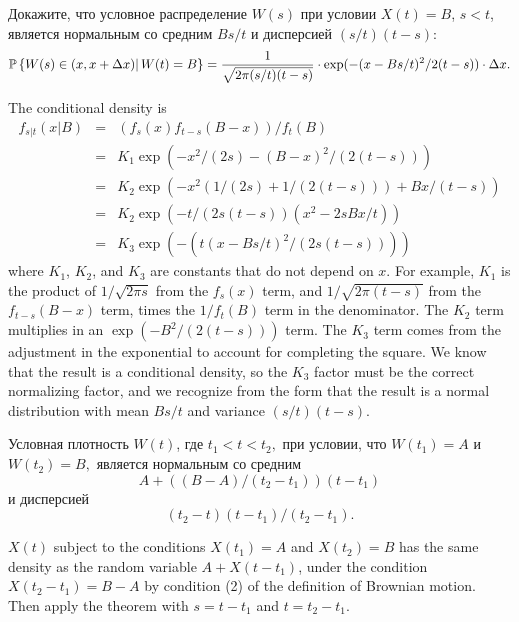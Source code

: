 \begin{problem}
  Докажите, что условное распределение $W(s)$ при условии $X(t)=B$,
  $s < t $, является нормальным со средним $B s/t$ и дисперсией $(s/t)(t-s)$:
  $$
    \mathbb{P}\left\{ W(s) \in (x,x+\Delta x) |\, W(t) = B\right\} =
    \frac{1}{\sqrt{2\pi (s/t)(t-s)}}\cdot \exp(-(x-Bs/t)^2/2(t-s)) \cdot\Delta x.
  $$


\begin{sol}

The conditional density is
\begin{eqnarray*}
  f_{s|t}(x|B) &=& ( f_s(x) f_{t-s}(B-x) )/ f_t(B) \\
  &=& K_1 \exp( -x^2/(2s) - (B-x)^2/( 2(t-s) ) ) \\
  &=& K_2 \exp(-x^2(1/(2 s)+ 1/(2 (t-s) )) + Bx/(t-s) ) \\
  &=& K_2 \exp( -t/( 2 s (t-s) ) ( x^2 - 2 s B x/t) ) \\
  &=& K_3 \exp( - (t (x - B s/t)^2/ (2 s (t-s)) ) )
\end{eqnarray*}
where $ K_1 $, $ K_2 $, and $ K_3 $ are constants that do not depend on $
x $.  For example, $ K_1 $ is the product of $ 1/\sqrt{2 \pi s} $ from
the $ f_s(x) $ term, and $ 1/\sqrt{2 \pi (t-s)} $ from the $ f_{t-s}(B-x)
$ term, times the $ 1/f_t(B) $ term in the denominator.  The $ K_2 $
term multiplies in an $ \exp(-B^2/(2 (t-s))) $ term.  The $ K_3 $ term
comes from the adjustment in the exponential to account for completing
the square.  We know that the result is a conditional density, so the $
K_3 $ factor must be the correct normalizing factor, and we recognize
from the form that the result is a normal distribution with mean $ B s/t
$ and variance $ (s/t) (t-s) $.
\end{sol}
\end{problem}

\begin{problem}
 Условная плотность $W(t)$, где $t_1 < t < t_2,$ при условии, что
  $W(t_1)=A$ и $W(t_2) = B,$ является нормальным со средним
  \[
    A + ( (B-A)/(t_2-t_1) ) (t-t_1)
  \]
  \ni и дисперсией
  \[
    (t_2-t)(t-t_1)/(t_2-t_1).
  \]


\begin{sol}
$ X(t) $ subject to the conditions $ X(t_1) = A $ and $ X(t_2)
= B $ has the same density as the random variable $ A + X(t-t_1) $,
under the condition $ X(t_2 - t_1) = B - A $ by condition (2) of the
definition of Brownian motion.  Then apply the theorem with $ s = t-t_1 $
and $ t = t_2 - t_1 $.
\end{sol}
\end{problem}

